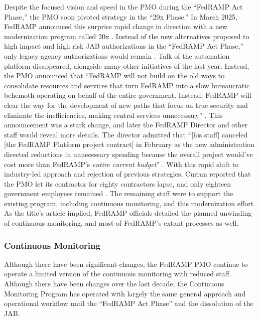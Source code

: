 \documentclass{jdf}
\begin{document}
Despite the focused vision and speed in the PMO during the ``FedRAMP Act Phase,'' the PMO soon pivoted strategy in the ``20x Phase.'' In March 2025, FedRAMP announced this surprise rapid change in direction with a new modernization program called 20x \citeyear{fedramp_blog_20x}. Instead of the new alternatives proposed to high impact and high risk JAB authorizations in the ``FedRAMP Act Phase,'' only legacy agency authorizations would remain \citeyear{fedramp_blog_20x}. Talk of the automation platform disappeared, alongside many other initiatives of the last year. Instead, the PMO announced that ``FedRAMP will not build on the old ways to consolidate resources and services that turn FedRAMP into a slow bureaucratic behemoth operating on behalf of the entire government. Instead, FedRAMP will clear the way for the development of new paths that focus on true security and eliminate the inefficiencies, making central services unnecessary'' \citeyear{fedramp_blog_20x}. This announcement was a stark change, and later the FedRAMP Director and other staff would reveal more details. The director admitted that ``[his staff] canceled [the FedRAMP Platform project contract] in February as the new administration directed reductions in unnecessary spending because the overall project would've cost more than FedRAMP's \textit{entire current budget}'' \citeyear{20x_waterman_platform_comment}. With this rapid shift to industry-led approach and rejection of previous strategies, Curran reported that the PMO let its contractor for eighty contractors lapse, and only eighteen government employees remained \citeyear{curran25}. The remaining staff were to support the existing program, including continuous monitoring, and this modernization effort. As the title's article implied, FedRAMP officials detailed the planned unwinding of continuous monitoring, and most of FedRAMP's extant processes as well.

\subsubsection{Continuous Monitoring} \label{conmon}

Although there have been significant changes, the FedRAMP PMO continue to operate a limited version of the continuous monitoring with reduced staff. Although there have been changes over the last decade, the Continuous Monitoring Program has operated with largely the same general approach and operational workflow until the ``FedRAMP Act Phase'' and the dissolution of the JAB.
\end{document}
